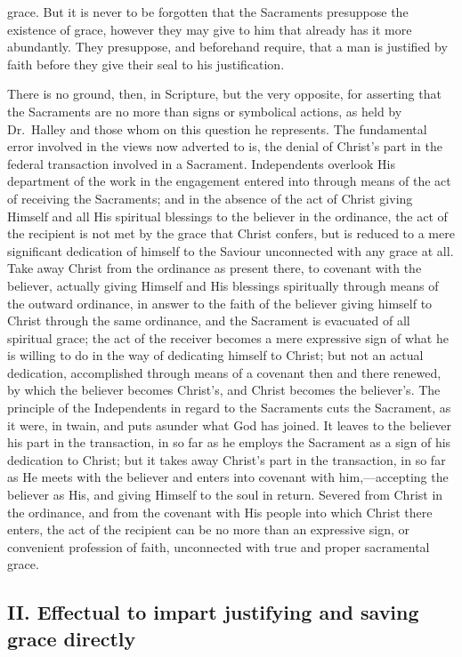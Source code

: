 \documentclass[]{book}
\begin{document}
grace. But it is never to be forgotten that the Sacraments presuppose the existence of grace, however they may give to him that already has it more abundantly. They presuppose, and beforehand require, that a man is justified by faith before they give their seal to his justification.

There is no ground, then, in Scripture, but the very opposite, for asserting that the Sacraments are no more than signs or symbolical actions, as held by Dr.~Halley and those whom on this question he represents. The fundamental error involved in the views now adverted to is, the denial of Christ's part in the federal transaction involved in a Sacrament. Independents overlook His department of the work in the engagement entered into through means of the act of receiving the Sacraments; and in the absence of the act of Christ giving Himself and all His spiritual blessings to the believer in the ordinance, the act of the recipient is not met by the grace that Christ confers, but is reduced to a mere significant dedication of himself to the Saviour unconnected with any grace at all. Take away Christ from the ordinance as present there, to covenant with the believer, actually giving Himself and His blessings spiritually through means of the outward ordinance, in answer to the faith of the believer giving himself to Christ through the same ordinance, and the Sacrament is evacuated of all spiritual grace; the act of the receiver becomes a mere expressive sign of what he is willing to do in the way of dedicating himself to Christ; but not an actual dedication, accomplished through means of a covenant then and there renewed, by which the believer becomes Christ's, and Christ becomes the believer's. The principle of the Independents in regard to the Sacraments cuts the Sacrament, as it were, in twain, and puts asunder what God has joined. It leaves to the believer his part in the transaction, in so far as he employs the Sacrament as a sign of his dedication to Christ; but it takes away Christ's part in the transaction, in so far as He meets with the believer and enters into covenant with him,---accepting the believer as His, and giving Himself to the soul in return. Severed from Christ in the ordinance, and from the covenant with His people into which Christ there enters, the act of the recipient can be no more than an expressive sign, or convenient profession of faith, unconnected with true and proper sacramental grace.

\hypertarget{ii.-effectual-to-impart-justifying-and-saving-grace-directly}{%
\subsection{II. Effectual to impart justifying and saving grace directly}\label{ii.-effectual-to-impart-justifying-and-saving-grace-directly}}
\end{document}
